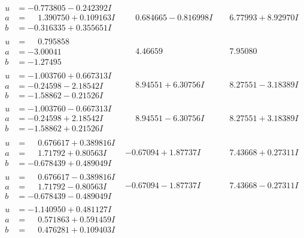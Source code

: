 \documentclass[1p]{elsarticle_modified}
\theoremstyle{definition}
\begin{document}
$$\begin{array}{c|c|c}
\begin{aligned}
u &= -0.773805 - 0.242392 I \\
a &= \phantom{-}1.390750 + 0.109163 I \\
b &= -0.316335 + 0.355651 I\end{aligned}
 & \phantom{-}0.684665 - 0.816998 I & \phantom{-}6.77993 + 8.92970 I \\ \hline\begin{aligned}
u &= \phantom{-}0.795858\phantom{ +0.000000I} \\
a &= -3.00041\phantom{ +0.000000I} \\
b &= -1.27495\phantom{ +0.000000I}\end{aligned}
 & \phantom{-}4.46659\phantom{ +0.000000I} & \phantom{-}7.95080\phantom{ +0.000000I} \\ \hline\begin{aligned}
u &= -1.003760 + 0.667313 I \\
a &= -0.24598 - 2.18542 I \\
b &= -1.58862 - 0.21526 I\end{aligned}
 & \phantom{-}8.94551 + 6.30756 I & \phantom{-}8.27551 - 3.18389 I \\ \hline\begin{aligned}
u &= -1.003760 - 0.667313 I \\
a &= -0.24598 + 2.18542 I \\
b &= -1.58862 + 0.21526 I\end{aligned}
 & \phantom{-}8.94551 - 6.30756 I & \phantom{-}8.27551 + 3.18389 I \\ \hline\begin{aligned}
u &= \phantom{-}0.676617 + 0.389816 I \\
a &= \phantom{-}1.71792 + 0.80563 I \\
b &= -0.678439 + 0.489049 I\end{aligned}
 & -0.67094 + 1.87737 I & \phantom{-}7.43668 + 0.27311 I \\ \hline\begin{aligned}
u &= \phantom{-}0.676617 - 0.389816 I \\
a &= \phantom{-}1.71792 - 0.80563 I \\
b &= -0.678439 - 0.489049 I\end{aligned}
 & -0.67094 - 1.87737 I & \phantom{-}7.43668 - 0.27311 I \\ \hline\begin{aligned}
u &= -1.140950 + 0.481127 I \\
a &= \phantom{-}0.571863 + 0.591459 I \\
b &= \phantom{-}0.476281 + 0.109403 I\end{aligned}

\end{array}$$
\end{document}
